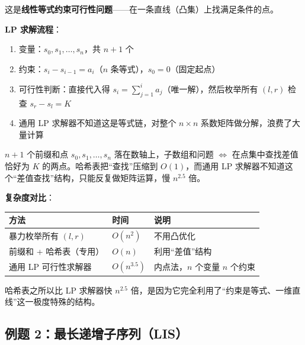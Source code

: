 \documentclass[12pt, a4paper]{ctexart}
\begin{document}
\begin{blackboard}
这是\textbf{线性等式约束可行性问题}——在一条直线（凸集）上找满足条件的点。

\textbf{LP 求解流程}：
\begin{enumerate}
    \item 变量：$s_0, s_1, \ldots, s_n$，共 $n+1$ 个
    \item 约束：$s_i - s_{i-1} = a_i$（$n$ 条等式），$s_0 = 0$（固定起点）
    \item 可行性判断：直接代入得 $s_i = \sum_{j=1}^{i} a_j$（唯一解），然后枚举所有 $(l,r)$ 检查 $s_r - s_l = K$
    \item 通用 LP 求解器不知道这是等式链，对整个 $n \times n$ 系数矩阵做分解，浪费了大量计算
\end{enumerate}

\begin{insight}[前缀和的几何意义]
$n+1$ 个前缀和点 $s_0, s_1, \ldots, s_n$ 落在数轴上，子数组和问题 $\Leftrightarrow$ 在点集中查找差值恰好为 $K$ 的两点。哈希表把``查找''压缩到 $O(1)$，而通用 LP 求解器不知道这个``差值查找''结构，只能反复做矩阵运算，慢 $n^{2.5}$ 倍。
\end{insight}

\textbf{复杂度对比}：

\begin{center}
\begin{tabular}{lll}
\toprule
方法 & 时间 & 说明 \\
\midrule
暴力枚举所有 $(l,r)$ & $O(n^2)$ & 不用凸优化 \\
前缀和 + 哈希表（专用） & $O(n)$ & 利用``差值''结构 \\
通用 LP 可行性求解器 & $O(n^{3.5})$ & 内点法，$n$ 个变量 $n$ 个约束 \\
\bottomrule
\end{tabular}
\end{center}

哈希表之所以比 LP 求解器快 $n^{2.5}$ 倍，是因为它完全利用了``约束是等式、一维直线''这一极度特殊的结构。

\end{blackboard}

\subsection{例题 2：最长递增子序列（LIS）}
\end{document}
